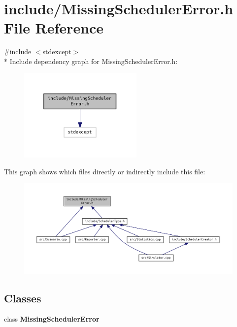 \section{include/\+Missing\+Scheduler\+Error.h File Reference}
\label{_missing_scheduler_error_8h}
{\ttfamily \#include $<$stdexcept$>$}\\*
Include dependency graph for Missing\+Scheduler\+Error.\+h\+:
\nopagebreak
\begin{figure}[H]
\begin{center}
\leavevmode
\includegraphics[width=172pt]{_missing_scheduler_error_8h__incl}
\end{center}
\end{figure}
This graph shows which files directly or indirectly include this file\+:
\nopagebreak
\begin{figure}[H]
\begin{center}
\leavevmode
\includegraphics[width=350pt]{_missing_scheduler_error_8h__dep__incl}
\end{center}
\end{figure}
\subsection*{Classes}
\begin{DoxyCompactItemize}
\item 
class {\bf Missing\+Scheduler\+Error}
\end{DoxyCompactItemize}
